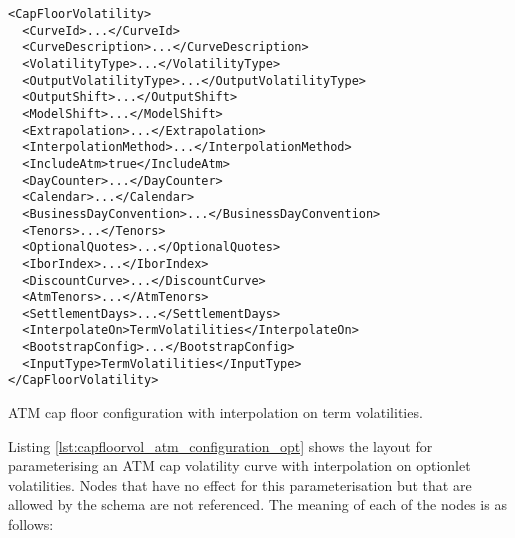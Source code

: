 \begin{longlisting}
\begin{verbatim}
<CapFloorVolatility>
  <CurveId>...</CurveId>
  <CurveDescription>...</CurveDescription>
  <VolatilityType>...</VolatilityType>
  <OutputVolatilityType>...</OutputVolatilityType>
  <OutputShift>...</OutputShift>
  <ModelShift>...</ModelShift>
  <Extrapolation>...</Extrapolation>
  <InterpolationMethod>...</InterpolationMethod>
  <IncludeAtm>true</IncludeAtm>
  <DayCounter>...</DayCounter>
  <Calendar>...</Calendar>
  <BusinessDayConvention>...</BusinessDayConvention>
  <Tenors>...</Tenors>
  <OptionalQuotes>...</OptionalQuotes>
  <IborIndex>...</IborIndex>
  <DiscountCurve>...</DiscountCurve>
  <AtmTenors>...</AtmTenors>
  <SettlementDays>...</SettlementDays>
  <InterpolateOn>TermVolatilities</InterpolateOn>
  <BootstrapConfig>...</BootstrapConfig>
  <InputType>TermVolatilities</InputType>
</CapFloorVolatility>
\end{verbatim}
\caption{ATM cap floor configuration with interpolation on term volatilities.}
\label{lst:capfloorvol_atm_configuration_term}
\end{longlisting}

Listing \ref{lst:capfloorvol_atm_configuration_opt} shows the layout for parameterising an ATM cap volatility curve with interpolation on optionlet volatilities. Nodes that have no effect for this parameterisation but that are allowed by the schema are not referenced. The meaning of each of the nodes is as follows:


